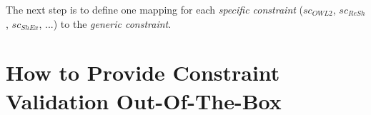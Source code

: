\documentclass{llncs}
\begin{document}
The next step is to define one mapping for each \emph{specific constraint} (\emph{$sc_{OWL 2}$}, \emph{$sc_{ReSh}$}, \emph{$sc_{ShEx}$}, ...) to the \emph{generic constraint}.



\section{How to Provide Constraint Validation Out-Of-The-Box}
\label{sec:validation}
\end{document}
